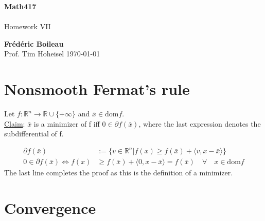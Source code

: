 \documentclass{article}
\begin{document}
	\begin{titlepage}
		\begin{center}
			\vspace*{1cm}
			\textbf{Math417}\\
			\\
			\vspace{0.5cm}
			Homework VII
			
			\vspace{1.5cm}
			
			\textbf{Frédéric Boileau}\\
			\vspace{2cm}
			Prof. 
			Tim Hoheisel
			\vfill
			\today
			\thispagestyle{empty}
		\end{center}
	\end{titlepage}
	\newpage
	\tableofcontents
	\thispagestyle{empty}
	\clearpage
	
	\section{Nonsmooth Fermat's rule}
	Let $f:\mathbb R ^n \rightarrow \mathbb R \cup \{+\infty\}$ and $\bar x \in \mathrm {dom} f$.\\
	\underline{Claim}: $\bar x $ is a minimizer of f iff $0\in \partial f(\bar x)$, where the last expression denotes the subdifferential of f.
	
	\begin{align*}
		\partial f(\bar x) &:= \{ v \in \mathbb R^n \vert f(x) \geq f(\bar x ) + \langle v,x-\bar x\rangle \}\\
		0\in \partial f(\bar x) \iff f(x) &\geq f(\bar x) + \langle 0, x- \bar x \rangle = f(\bar x) \quad \forall  \quad x \in \mathrm{dom} f  
	\end{align*} 
	The last line completes the proof as this is the definition of a minimizer.
	
	\section{Convergence }
	
\end{document}
